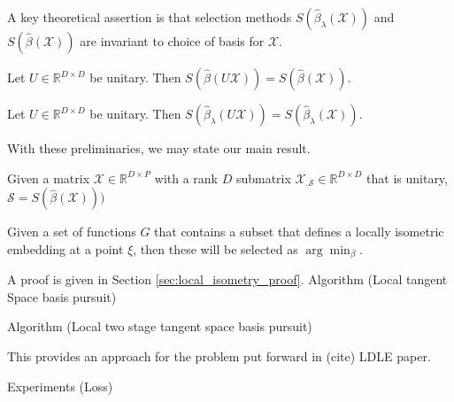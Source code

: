 A key theoretical assertion is that selection methods $S(\widehat {\beta}_{\lambda} (\mathcal X))$ and $S(\widehat {\beta} (\mathcal X))$ are invariant to choice of basis for $\mathcal X$.

\begin{proposition}
\label{prop:basis_pursuit_selection_equivalence}
Let $U \in \mathbb R^{D \times D}$ be unitary.
 Then $S(\widehat \beta  (U \mathcal X)) = S(\widehat \beta (\mathcal X))$.
\end{proposition}

\begin{proposition}
\label{prop:lasso_selection_equivalence}
Let $U \in \mathbb R^{D \times D}$ be unitary.
 Then $S(\widehat \beta_{\lambda}  (U \mathcal X)) = S(\widehat \beta_{\lambda} (\mathcal X))$.
\end{proposition}


With these preliminaries, we may state our main result.

\begin{proposition}

Given a matrix $\mathcal X \in \mathbb R^{D \times P}$ with a rank $D$ submatrix $\mathcal X_{.\mathcal S} \in \mathbb R^{D \times D}$ that is unitary, $\mathcal S = S(\widehat{\beta} (\mathcal X)))$
 \end{proposition}
 
\begin{proposition}
\label{prop:local_isometry}
Given a set of functions $G$ that contains a subset that defines a locally isometric embedding at a point $\xi$, then these will be selected as $\arg \min_\beta$.
\end{proposition}
A proof is given in Section \ref{sec:local_isometry_proof}.
Algorithm (Local tangent Space basis pursuit)

Algorithm (Local two stage tangent space basis pursuit)

This provides an approach for the problem put forward in (cite) LDLE paper.

Experiments (Loss)

